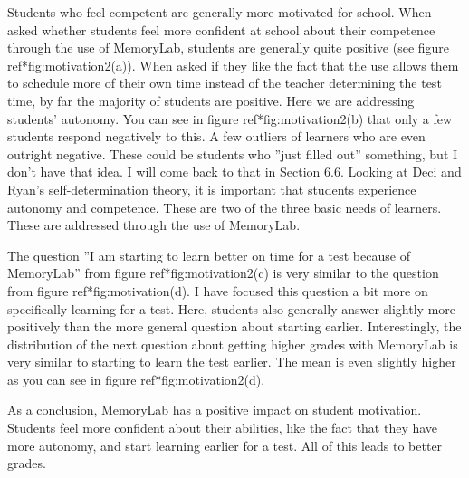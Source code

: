 \documentclass[12pt, a4paper]{article}
\begin{document}
{{Students who feel competent are generally more motivated for school. When asked whether students feel
more confident at school about their competence through the use of MemoryLab, students are generally quite positive
(see figure ref*{fig:motivation2}(a)). When asked if they like the fact that the use allows them to schedule more of their own time instead of the teacher determining the test time, by far the majority of students are positive. Here we are addressing students' autonomy. You can see in figure ref*{fig:motivation2}(b) that only a few students respond negatively to this. A few outliers of learners who are even outright negative. These could be students who ''just filled out'' something, but I don't have that idea. I will come back to that in Section 6.6. Looking at Deci and Ryan's self-determination theory, it is important that students experience autonomy and competence. These are two of the three basic needs of learners. These are addressed through the use of MemoryLab.

The question ''I am starting to learn better on time for a test because of MemoryLab'' from figure ref*{fig:motivation2}(c) is very similar to the question from figure ref*{fig:motivation}(d). I have focused this question a bit more on specifically learning for a test. Here, students also generally answer slightly more positively than the more general question about starting earlier. Interestingly, the distribution of the next question about getting higher grades with MemoryLab is very similar to starting to learn the test earlier. The mean is even slightly higher as you can see in figure ref*{fig:motivation2}(d).

As a conclusion, MemoryLab has a positive impact on student motivation. Students feel more confident about their abilities, like the fact that they have more autonomy, and start learning earlier for a test. All of this leads to better grades.

}}
\end{document}
